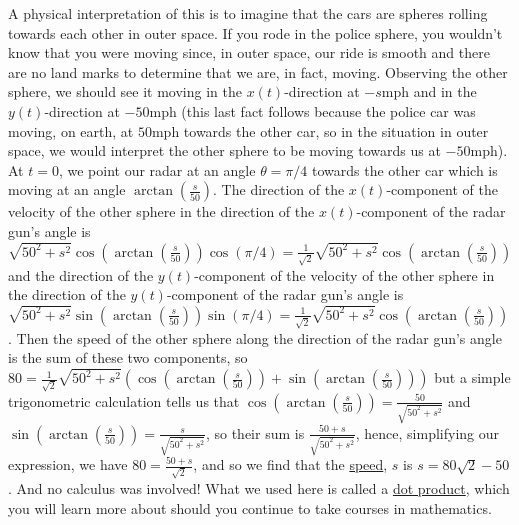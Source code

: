 \documentclass{ximera}
\begin{document}
\begin{exercise}
\begin{hint}
A physical interpretation of this is to imagine that the cars are spheres rolling towards each other in outer space. If you rode in the police sphere, you wouldn't know that you were moving since, in outer space, our ride is smooth and there are no land marks to determine that we are, in fact, moving. Observing the other sphere, we should see it moving in the $x(t)$-direction at $-s$mph and in the $y(t)$-direction at $-50$mph (this last fact follows because the police car was moving, on earth, at $50$mph towards the other car, so in the situation in outer space, we would interpret the other sphere to be moving towards us at $-50$mph). At $t=0$, we point our radar at an angle $\theta=\pi/4$ towards the other car which is moving at an angle $\arctan(\frac{s}{50})$. The direction of the $x(t)$-component of the velocity of the other sphere in the direction of the $x(t)$-component of the radar gun's angle is $\sqrt{50^2+s^2}\cos(\arctan(\frac{s}{50}))\cos(\pi/4)=\frac{1}{\sqrt{2}}\sqrt{50^2+s^2}\cos(\arctan(\frac{s}{50}))$ and the direction of the $y(t)$-component of the velocity of the other sphere in the direction of the $y(t)$-component of the radar gun's angle is $\sqrt{50^2+s^2}\sin(\arctan(\frac{s}{50}))\sin(\pi/4)=\frac{1}{\sqrt{2}}\sqrt{50^2+s^2}\cos(\arctan(\frac{s}{50}))$. Then the speed of the other sphere along the direction of the radar gun's angle is the sum of these two components, so $80=\frac{1}{\sqrt{2}}\sqrt{50^2+s^2}\left(\cos(\arctan(\frac{s}{50}))+\sin(\arctan(\frac{s}{50}))\right)$ but a simple trigonometric calculation tells us that $\cos(\arctan(\frac{s}{50}))=\frac{50}{\sqrt{50^2+s^2}}$ and $\sin(\arctan(\frac{s}{50}))=\frac{s}{\sqrt{50^2+s^2}}$, so their sum is $\frac{50+s}{\sqrt{50^2+s^2}}$, hence, simplifying our expression, we have $80=\frac{50+s}{\sqrt{2}}$, and so we find that the \underline{speed}, $s$ is $s=80\sqrt{2}-50$. And no calculus was involved! What we used here is called a \underline{dot product}, which you will learn more about should you continue to take courses in mathematics.
\end{hint}
\end{exercise}
\end{document}
